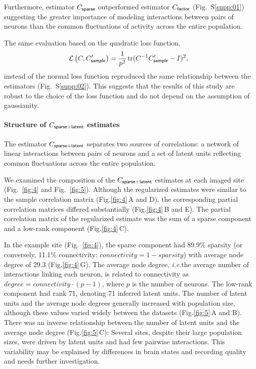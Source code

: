 \documentclass[10pt]{article}
\DeclareMathOperator{\Tr}{tr}
\newcommand{\figref}[2]{Fig.\;\ref{fig:#1}\,#2}
\newcommand{\loss}[1]{\mathcal L\left(#1\right)}
\newcommand{\ie}{\emph{i.e.}\;}
\begin{document}
Furthermore, estimator $C_{\sf sparse}$ outperformed estimator $C_{\sf factor}$ (Fig.~S\ref{supp:01}) suggesting the greater importance of modeling interactions between pairs of neurons than the common fluctuations of activity across the entire population.

The same evaluation based on the quadratic loss function,
\begin{equation}\label{eq:quad}
\loss{C,C_{\sf sample}^\prime}=\frac 1 {p^2}\Tr(C^{-1}C_{\sf sample}^\prime-I)^2,
\end{equation}
instead of the normal loss function reproduced the same relationship between the estimators (Fig.~S\ref{supp:02}). This suggests that the results of this study are robust to the choice of the loss function and do not depend on the assumption of gaussianity. 

\paragraph{Structure of $C_{\sf sparse+latent}$ estimates}
The estimator $C_{\sf sparse+latent}$ separates two sources of correlations: a network of linear interactions between pairs of neurons and a set of latent units reflecting common fluctuations across the entire population.  

We examined the composition of the $C_{\sf sparse+latent}$ estimates at each imaged site (Fig.~\ref{fig:4} and Fig.~\ref{fig:5}). Although the regularized estimates were similar to the sample correlation matrix (\figref{4}{A and D}), the corresponding partial correlation matrices differed substantially (\figref{4}{B and E}). The partial correlation matrix of the regularized estimate was the sum of a sparse component and a low-rank component (\figref{4}{C}).  

In the example site (Fig.~\ref{fig:4}), the sparse component had 89.9\% sparsity (or conversely, 11.1\% connectivity: $connectivity=1-sparsity$) with average node degree of 29.3 (\figref{4}{G}). The average node degree, \ie the average number of interactions linking each neuron, is related to connectivity as $degree = connectivity\cdot(p-1)$, where $p$ is the number of neurons. The low-rank component had rank 71, denoting 71 inferred latent units. The number of latent units and the average node degrees generally increased with population size, although these values varied widely between the datasets (\figref{5}{A and B}). There was an inverse relationship between the number of latent units and the average node degree (\figref{5}{C}): Several sites, despite their large population sizes, were driven by latent units and had few pairwise interactions. This variability may be explained by differences in brain states and recording quality and needs further investigation.
\end{document}
